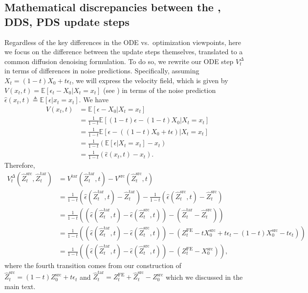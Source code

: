 \subsection{Mathematical discrepancies between the \ours{}, DDS, PDS update steps}
\label{sec:stepsize}
Regardless of the key differences in the ODE vs.~optimization viewpoints, here we focus on the difference between the update steps themselves, translated to a common diffusion denoising formulation. To do so, we rewrite our ODE step $V^\Delta_t$ in terms of differences in noise predictions. Specifically, assuming $X_t=(1-t)X_0+t\epsilon_t$, we will express the velocity field, which is given by $V(x_t,t)=\mathbb{E}[\epsilon_t-X_0|X_t=x_t]$ (see \cite{liu2023flow}) in terms of the noise prediction $\hat{\epsilon}(x_t,t)\triangleq\mathbb{E}[\epsilon|x_t=x_t]$.
We have
\begin{align}
    V(x_t,t)&= \mathbb{E}[\epsilon-X_0|X_t=x_t] \nonumber \\
    &= \frac{1}{1-t}\mathbb{E}[(1-t)\epsilon-(1-t)X_0|X_t=x_t] \nonumber \\
    &= \frac{1}{1-t}\mathbb{E}[\epsilon-((1-t)X_0+t\epsilon)|X_t=x_t] \nonumber \\
    &= \frac{1}{1-t}(\mathbb{E}[\epsilon|X_t=x_t]-x_t) \nonumber \\
    &= \frac{1}{1-t}(\hat{\epsilon}(x_t,t)-x_t).
\end{align}
Therefore,
\begin{align}
        V^{\Delta}_{t}(\hat{Z}^{\text{src}}_{t},\hat{Z}^{\text{tar}}_{t}) &= V^{\text{tar}}(\hat{Z}^{\text{tar}}_{t},t)-V^{\text{src}}(\hat{Z}^{\text{src}}_{t},t) \nonumber\\
        &= \frac{1}{1-t}\left(\hat{\epsilon}(\hat{Z}^{\text{tar}}_{t},t)-\hat{Z}^\text{tar}_t\right)-\frac{1}{1-t}\left(\hat{\epsilon}(\hat{Z}^{\text{src}}_{t},t)-\hat{Z}^\text{src}_t\right) \nonumber \\
        &= \frac{1}{1-t}\left(\left(\hat{\epsilon}(\hat{Z}^{\text{tar}}_{t},t)-\hat{\epsilon}(\hat{Z}^{\text{src}}_{t},t)\right)-\left(\hat{Z}^\text{tar}_t-\hat{Z}^\text{src}_t\right)\right) \nonumber \\
        &= \frac{1}{1-t}\left(\left(\hat{\epsilon}(\hat{Z}^{\text{tar}}_{t},t)-\hat{\epsilon}(\hat{Z}^{\text{src}}_{t},t)\right)-\left(Z^{\text{FE}}_t-tX^{\text{src}}_0+t\epsilon_t-(1-t)X^{\text{src}}_0-t\epsilon_t\right)\right) \nonumber \\
        &= \frac{1}{1-t}\left(\left(\hat{\epsilon}(\hat{Z}^{\text{tar}}_{t},t)-\hat{\epsilon}(\hat{Z}^{\text{src}}_{t},t)\right)-\left(Z^{\text{FE}}_t-X^{\text{src}}_0\right)\right),
\end{align}
where the fourth transition comes from our construction of $\hat{Z}^{\text{src}}_{t} =(1-t)Z_0^{\text{src}}+t\epsilon_t$ and $\hat{Z}^{\text{tar}}_t=Z^{\text{FE}}_t+\hat{Z}^{\text{src}}_t-Z^{\text{src}}_0$ which we discussed in the main text. 

